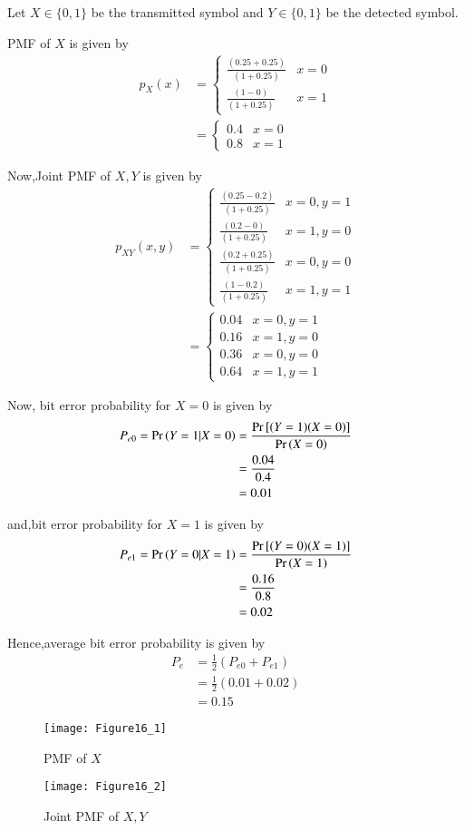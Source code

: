 \documentclass[journal,12pt,twocolumn]{IEEEtran}
\begin{document}
Let $X \in \{0,1\}$ be the transmitted symbol and $Y \in \{0,1\}$ be the detected symbol.

PMF of $X$ is given by
\begin{align}
p_X(x) &= 
\begin{cases} 
\frac{(0.25+0.25)}{(1+0.25)} & x=0 \\     
\frac{(1-0)}{(1+0.25)} & x=1
\end{cases}
\\
&=
\begin{cases} 
0.4 & x=0 \\     
0.8 & x=1
\end{cases}
\end{align}

Now,Joint PMF of $X,Y$ is given by
\begin{align}
p_{XY}(x,y) &= 
\begin{cases}  
\frac{(0.25-0.2)}{(1+0.25)} & x=0,y=1 \\
\frac{(0.2-0)}{(1+0.25)}  & x=1,y=0 \\
\frac{(0.2+0.25)}{(1+0.25)} & x=0,y=0 \\
\frac{(1-0.2)}{(1+0.25)} & x=1,y=1
\end{cases}
\\
&=
\begin{cases}  
0.04 & x=0,y=1 \\
0.16 & x=1,y=0 \\
0.36 & x=0,y=0 \\
0.64 & x=1,y=1
\end{cases}
\end{align}

Now, bit error probability for $X=0$ is given by
\begin{align}
    P_{e0} = \Pr\left(Y=1|X=0\right) &= \frac{\text{Pr}{}\left[(Y=1)(X=0)\right]}{\Pr\left(X=0\right)} \\
    &= \frac{0.04}{0.4} \\
    &= 0.01
\end{align}

and,bit error probability for $X=1$ is given by
\begin{align}
    P_{e1} = \Pr\left(Y=0|X=1\right) &= \frac{\text{Pr}{}\left[(Y=0)(X=1)\right]}{\Pr\left(X=1\right)} \\
    &= \frac{0.16}{0.8} \\
    &= 0.02
\end{align}

Hence,average bit error probability is given by
\begin{align}
    P_e &= \frac{1}{2}(P_{e0}+P_{e1}) \\
    &= \frac{1}{2}(0.01+0.02) \\
    &= \boxed{0.15}
\end{align}

\begin{figure}[!ht]
\centering
\texttt{[image: Figure16\_1]}
\caption{PMF of $X$}
\label{fig:pmf_x}	
\end{figure}

\begin{figure}[!ht]
\centering
\texttt{[image: Figure16\_2]}
\caption{Joint PMF of $X,Y$}
\label{fig:joint_pmf}	
\end{figure}
\end{document}
